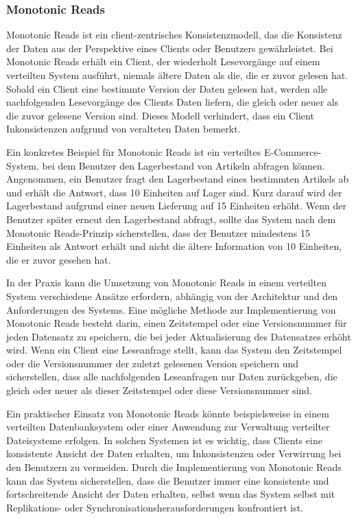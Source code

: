 \documentclass[../vs-script-first-v01.tex]{subfiles}
\begin{document}
\subsubsection{Monotonic Reads}

Monotonic Reads ist ein client-zentrisches Konsistenzmodell, das die Konsistenz der Daten aus der Perspektive eines Clients oder Benutzers gewährleistet. Bei Monotonic Reads erhält ein Client, der wiederholt Lesevorgänge auf einem verteilten System ausführt, niemals ältere Daten als die, die er zuvor gelesen hat. Sobald ein Client eine bestimmte Version der Daten gelesen hat, werden alle nachfolgenden Lesevorgänge des Clients Daten liefern, die gleich oder neuer als die zuvor gelesene Version sind. Dieses Modell verhindert, dass ein Client Inkonsistenzen aufgrund von veralteten Daten bemerkt.

Ein konkretes Beispiel für Monotonic Reads ist ein verteiltes E-Commerce-System, bei dem Benutzer den Lagerbestand von Artikeln abfragen können. Angenommen, ein Benutzer fragt den Lagerbestand eines bestimmten Artikels ab und erhält die Antwort, dass 10 Einheiten auf Lager sind. Kurz darauf wird der Lagerbestand aufgrund einer neuen Lieferung auf 15 Einheiten erhöht. Wenn der Benutzer später erneut den Lagerbestand abfragt, sollte das System nach dem Monotonic Reads-Prinzip sicherstellen, dass der Benutzer mindestens 15 Einheiten als Antwort erhält und nicht die ältere Information von 10 Einheiten, die er zuvor gesehen hat.

In der Praxis kann die Umsetzung von Monotonic Reads in einem verteilten System verschiedene Ansätze erfordern, abhängig von der Architektur und den Anforderungen des Systems. Eine mögliche Methode zur Implementierung von Monotonic Reads besteht darin, einen Zeitstempel oder eine Versionsnummer für jeden Datensatz zu speichern, die bei jeder Aktualisierung des Datensatzes erhöht wird. Wenn ein Client eine Leseanfrage stellt, kann das System den Zeitstempel oder die Versionsnummer der zuletzt gelesenen Version speichern und sicherstellen, dass alle nachfolgenden Leseanfragen nur Daten zurückgeben, die gleich oder neuer als dieser Zeitstempel oder diese Versionsnummer sind.

Ein praktischer Einsatz von Monotonic Reads könnte beispielsweise in einem verteilten Datenbanksystem oder einer Anwendung zur Verwaltung verteilter Dateisysteme erfolgen. In solchen Systemen ist es wichtig, dass Clients eine konsistente Ansicht der Daten erhalten, um Inkonsistenzen oder Verwirrung bei den Benutzern zu vermeiden. Durch die Implementierung von Monotonic Reads kann das System sicherstellen, dass die Benutzer immer eine konsistente und fortschreitende Ansicht der Daten erhalten, selbst wenn das System selbst mit Replikations- oder Synchronisationsherausforderungen konfrontiert ist.
\end{document}
